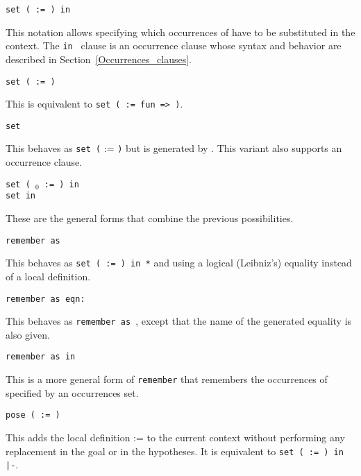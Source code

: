 \begin{coq_example*}
\begin{Variants}
\item {\tt set ( {\ident} := {\term} ) in {\occgoalset}}

This notation allows specifying which occurrences of {\term} have to
be substituted in the context. The {\tt in {\occgoalset}} clause is an
occurrence clause whose syntax and behavior are described in
Section~\ref{Occurrences_clauses}.

\item {\tt set ( {\ident} \nelistnosep{\binder} := {\term} )}

  This is equivalent to {\tt set ( {\ident} := fun
  \nelistnosep{\binder} => {\term} )}.

\item {\tt set \term}

  This behaves as {\tt set (} {\ident} := {\term} {\tt )} but {\ident}
  is generated by {\Coq}. This variant also supports an occurrence clause.

\item {\tt set ( {\ident$_0$} \nelistnosep{\binder} := {\term} ) in {\occgoalset}}\\
      {\tt set {\term} in {\occgoalset}}

  These are the general forms that combine the previous possibilities.

\item {\tt remember {\term} as {\ident}}

  This behaves as {\tt set ( {\ident} := {\term} ) in *} and using a
  logical (Leibniz's) equality instead of a local definition.

\item {\tt remember {\term} as {\ident} eqn:{\ident}}

  This behaves as {\tt remember {\term} as {\ident}}, except
  that the name of the generated equality is also given.

\item {\tt remember {\term} as {\ident} in {\occgoalset}}

  This is a more general form of {\tt remember} that remembers the
  occurrences of {\term} specified by an occurrences set.

\item {\tt pose ( {\ident} := {\term} )}

  This adds the local definition {\ident} := {\term} to the current
  context without performing any replacement in the goal or in the
  hypotheses. It is equivalent to {\tt set ( {\ident} {\tt :=}
  {\term} {\tt ) in |-}}.


\end{Variants}
\end{coq_example*}
